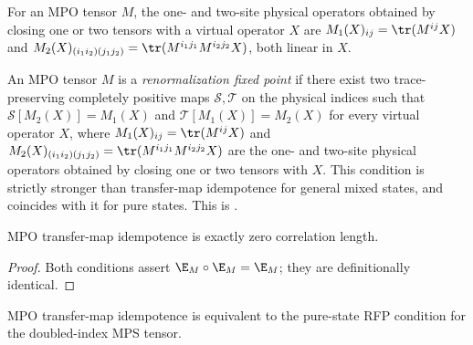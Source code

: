 \begin{definition}
    \label{def:phys_close}
    \leanok
    For an MPO tensor $M$, the one- and two-site physical operators obtained by
    closing one or two tensors with a virtual operator $X$ are
    $M_1(X)_{ij} = \tr(M^{ij} X)$ and
    $M_2(X)_{(i_1 i_2)(j_1 j_2)} = \tr(M^{i_1 j_1} M^{i_2 j_2} X)$, both linear
    in $X$.
\end{definition}

\begin{definition}
    \label{def:is_rfp_via_ts}
    \leanok
    An MPO tensor $M$ is a \emph{renormalization fixed point} if there exist two
    trace-preserving completely positive maps $\mathcal{S}, \mathcal{T}$ on the
    physical indices such that $\mathcal{S}[M_2(X)] = M_1(X)$ and
    $\mathcal{T}[M_1(X)] = M_2(X)$ for every virtual operator $X$, where
    $M_1(X)_{ij} = \tr(M^{ij} X)$ and
    $M_2(X)_{(i_1 i_2)(j_1 j_2)} = \tr(M^{i_1 j_1} M^{i_2 j_2} X)$ are the one-
    and two-site physical operators obtained by closing one or two tensors with
    $X$. This condition is strictly stronger than transfer-map idempotence for
    general mixed states, and coincides with it for pure states.
    This is \cite[Definition~4.1, line~657]{Cirac2016MPDO_arXiv}.
\end{definition}

\begin{theorem}\label{thm:is_rfp_iff_is_zcl}
    \leanok
    MPO transfer-map idempotence is exactly zero correlation length.
\end{theorem}

\begin{proof}
    \leanok
    Both conditions assert $\E_M \circ \E_M = \E_M$; they are definitionally
    identical.
\end{proof}

\begin{theorem}
    \label{thm:is_rfp_iff_to_mps_rfp}
    \leanok
    MPO transfer-map idempotence is equivalent to the pure-state RFP condition
    for the doubled-index MPS tensor.
\end{theorem}


